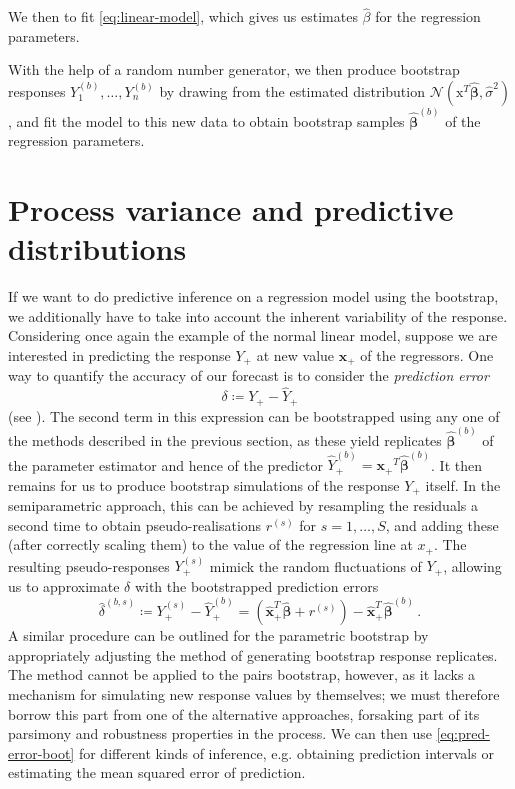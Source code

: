 \documentclass[a4paper]{book}
\begin{document}
We then  to fit \cref{eq:linear-model}, which gives us estimates $\widehat{\beta}$ for the regression parameters. 

With the help of a random number generator, we then produce bootstrap responses $Y^{(b)}_1, \dots, Y^{(b)}_n$ by drawing from the estimated distribution $\mathcal{N}(\bm{\mathrm{x}}^T \widehat{\bm{\beta}}, \widehat{\sigma}^2)$, and fit the model to this new data to obtain bootstrap samples $\widehat{\bm{\beta}}^{(b)}$ of the regression parameters.

\section{Process variance and predictive distributions} \label{sec:boot-proc}

If we want to do predictive inference on a regression model using the bootstrap, we additionally have to take into account the inherent variability of the response. Considering once again the example of the normal linear model, suppose we are interested in predicting the response $Y_+$ at new value $\mathbf{x_+}$ of the regressors. One way to quantify the accuracy of our forecast is to consider the \emph{prediction error}
\begin{equation}
  \delta \coloneqq Y_+ - \widehat{Y}_+
\end{equation}
(see \cite[Algorithm 6.4]{davison}). The second term in this expression can be bootstrapped using any one of the methods described in the previous section, as these yield replicates $\widehat{\bm{\beta}}^{(b)}$ of the parameter estimator and hence of the predictor $\widehat{Y}^{(b)}_+ = \mathbf{x_+}^T \widehat{\bm{\beta}}^{(b)}$. It then remains for us to produce bootstrap simulations of the response $Y_+$ itself. In the semiparametric approach, this can be achieved by resampling the residuals a second time to obtain pseudo-realisations $r^{(s)}$ for $s = 1, \dots, S$, and adding these (after correctly scaling them) to the value of the regression line at $x_+$. The resulting pseudo-responses $Y^{(s)}_+$ mimick the random fluctuations of $Y_+$, allowing us to approximate $\delta$ with the bootstrapped prediction errors
\begin{equation} \label{eq:pred-error-boot}
  \widehat{\delta}^{(b, s)} \coloneqq Y^{(s)}_+ - \widehat{Y}^{(b)}_+ = (\widehat{\mathbf{x}}^T_+ \widehat{\bm{\beta}} + r^{(s)}) - \widehat{\mathbf{x}}^T_+ \widehat{\bm{\beta}}^{(b)} \,.
\end{equation}
A similar procedure can be outlined for the parametric bootstrap by appropriately adjusting the method of generating bootstrap response replicates. The method cannot be applied to the pairs bootstrap, however, as it lacks a mechanism for simulating new response values by themselves; we must therefore borrow this part from one of the alternative approaches, forsaking part of its parsimony and robustness properties in the process. We can then use \cref{eq:pred-error-boot} for different kinds of inference, e.g. obtaining prediction intervals or estimating the mean squared error of prediction.
\end{document}
